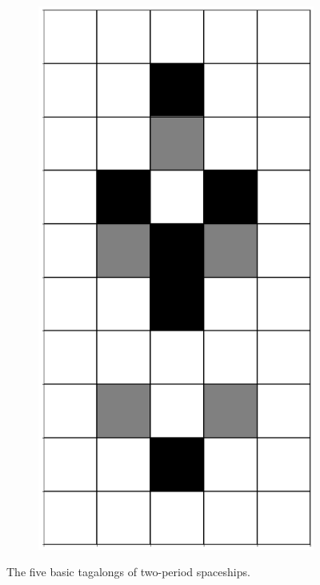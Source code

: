 \documentclass[12pt]{article}
\numberwithin{figure}{section} %
\begin{document}
\begin{figure}[H]
\begin{subfigure}{0.18\textwidth}
     		\subcaption{}
   	\end{subfigure}
        \begin{subfigure}{0.18\textwidth}
     		\centering
     		\includegraphics[angle=270,width=\linewidth]{Section4/8.4}
     		\subcaption{}
   	\end{subfigure}
      	\newline
   	\caption[Tagalongs of the two-period spaceships]{The five basic tagalongs of two-period spaceships.}
   	\label{fig:tagalongs of two-period spaceships}
\end{figure}
\end{document}
